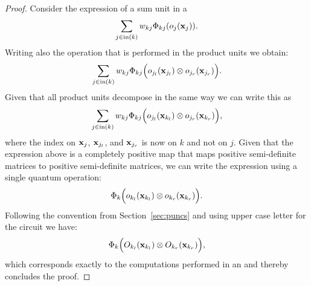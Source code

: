 \begin{proof}
	Consider the expression of a sum unit in a \dpunc
	\begin{align}
		\sum_{j\in\text{in}(k)} w_{kj} \Phi_{kj} (o_j(\mathbf{x}_j) ).
	\end{align}
	Writing also the operation that is performed in the product units we obtain:
	\begin{align}
		\sum_{j\in\text{in}(k)} w_{kj} \Phi_{kj} \Bigl(o_{j_l}(\mathbf{x}_{j_l}) \otimes o_{j_r}(\mathbf{x}_{j_r})   \Bigr).
	\end{align}
	Given that all product units decompose in the same way we can write this as
	\begin{align}
		\sum_{j\in\text{in}(k)} w_{kj} \Phi_{kj} \Bigl(o_{j_l}(\mathbf{x}_{k_l}) \otimes o_{j_r}(\mathbf{x}_{k_r})   \Bigr),
	\end{align}
	where the index on $\mathbf{x}_j$, $\mathbf{x}_{j_l}$, and $\mathbf{x}_{j_r}$ is now on $k$ and not on $j$. Given that the expression above is a completely positive map \citep{nielsen2001quantum} that maps positive semi-definite matrices to positive semi-definite matrices, we can write the expression using a single quantum operation:
	\begin{align}
		\Phi_{k} \Bigl(o_{k_l}(\mathbf{x}_{k_l}) \otimes o_{k_r}(\mathbf{x}_{k_r})   \Bigr).
	\end{align}
	Following the convention from Section~\ref{sec:puncs} and using upper case letter for the circuit we have:
	\begin{align}
		\Phi_{k} \Bigl(O_{k_l}(\mathbf{x}_{k_l}) \otimes O_{k_r}(\mathbf{x}_{k_r})   \Bigr),
	\end{align}
	which corresponds exactly to the computations performed in an \sdpunc and thereby concludes the proof.
\end{proof}











